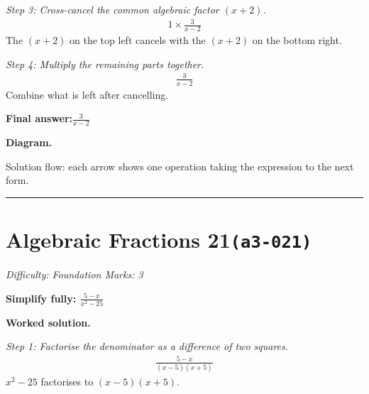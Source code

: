 \documentclass[11pt]{article}
\newcommand{\question}[1]{\par\medskip\noindent\textbf{#1}\par}
\begin{document}
\textit{Step 3: Cross-cancel the common algebraic factor \( (x+2) \).}
\[\begin{gathered}
1 \times \frac{3}{x-2}
\end{gathered}\]
The \( (x+2) \) on the top left cancels with the \( (x+2) \) on the bottom right.

\textit{Step 4: Multiply the remaining parts together.}
\[\begin{gathered}
\frac{3}{x-2}
\end{gathered}\]
Combine what is left after cancelling.

\begin{answerbox}
\textbf{Final answer:}\quad \(\displaystyle \frac{3}{x-2}\)
\end{answerbox}
\textbf{Diagram.}

\begin{center}
\end{center}
\small Solution flow: each arrow shows one operation taking the expression to the next form.\normalsize

\medskip\hrule

\section*{Algebraic Fractions 21\quad\small\texttt{(a3-021)}}
\textit{Difficulty: Foundation \quad\textbar\quad Marks: 3}

\question{Simplify fully: \( \frac{5 - x}{x^2 - 25} \)}

\textbf{Worked solution.}

\textit{Step 1: Factorise the denominator as a difference of two squares.}
\[\begin{gathered}
\frac{5 - x}{(x - 5)(x + 5)}
\end{gathered}\]
\( x^2 - 25 \) factorises to \( (x - 5)(x + 5) \).
\end{document}
